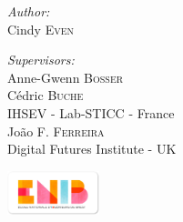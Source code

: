 \documentclass[11pt]{article}
\begin{document}
\begin{titlepage}
\begin{center}
\begin{minipage}{0.4\textwidth}
\begin{flushleft} \large
\emph{Author:}\\
Cindy  \textsc{Even}
\end{flushleft}
\end{minipage}
\begin{minipage}{0.4\textwidth}
\begin{flushright} \large
\emph{Supervisors:} \\[2ex]
%
Anne-Gwenn \textsc{Bosser } \\
C\'{e}dric \textsc{Buche } \\
IHSEV - Lab-STICC - France\\[2ex]
Jo\~{a}o \textsc{F. Ferreira } \\
Digital Futures Institute - UK
\end{flushright}
\end{minipage}

\vfill


\begin{flushleft}
\includegraphics[width=0.2\textwidth]{./logos/enib}
\end{flushleft}
\end{center}
\end{titlepage}

\end{document}
